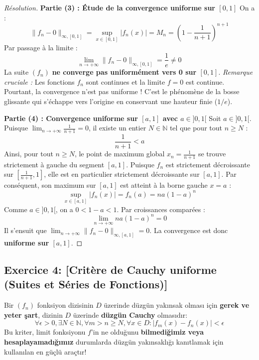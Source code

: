 \documentclass[12pt,a4paper]{report}
\begin{document}
\begin{proof}[Résolution]
\textbf{Partie (3) : Étude de la convergence uniforme sur $[0, 1]$}
On a :
\[ \|f_n - 0\|_{\infty, [0, 1]} = \sup_{x \in [0, 1]} |f_n(x)| = M_n = \left( 1 - \frac{1}{n+1} \right)^{n+1} \]
Par passage à la limite :
\[ \lim_{n \to +\infty} \|f_n - 0\|_{\infty, [0, 1]} = \frac{1}{e} \neq 0 \]
La suite $(f_n)$ \textbf{ne converge pas uniformément vers 0 sur $[0, 1]$}.
\textit{Remarque cruciale :} Les fonctions $f_n$ sont continues et la limite $f=0$ est continue. Pourtant, la convergence n'est pas uniforme ! C'est le phénomène de la bosse glissante qui s'échappe vers l'origine en conservant une hauteur finie ($1/e$).

\textbf{Partie (4) : Convergence uniforme sur $[a, 1]$ avec $a \in ]0, 1[$}
Soit $a \in ]0, 1[$. Puisque $\lim_{n \to +\infty} \frac{1}{n+1} = 0$, il existe un entier $N \in \mathbb{N}$ tel que pour tout $n \ge N$ :
\[ \frac{1}{n+1} < a \]
Ainsi, pour tout $n \ge N$, le point de maximum global $x_n = \frac{1}{n+1}$ se trouve strictement à gauche du segment $[a, 1]$.
Puisque $f_n$ est strictement décroissante sur $[\frac{1}{n+1}, 1]$, elle est en particulier strictement décroissante sur $[a, 1]$.
Par conséquent, son maximum sur $[a, 1]$ est atteint à la borne gauche $x = a$ :
\[ \sup_{x \in [a, 1]} |f_n(x)| = f_n(a) = na(1-a)^n \]
Comme $a \in ]0, 1[$, on a $0 < 1-a < 1$. Par croissances comparées :
\[ \lim_{n \to +\infty} na(1-a)^n = 0 \]
Il s'ensuit que $\lim_{n \to +\infty} \|f_n - 0\|_{\infty, [a, 1]} = 0$.
La convergence est donc \textbf{uniforme sur $[a, 1]$}.
\end{proof}

\subsection*{Exercice 4: [Critère de Cauchy uniforme (Suites et Séries de Fonctions)]}

\begin{tcolorbox}[colback=teal!5!white,colframe=teal!75!black,title=Hatırlatma: Düzgün Cauchy Kriteri (Critère de Cauchy Uniforme)]
Bir $(f_n)$ fonksiyon dizisinin $D$ üzerinde düzgün yakınsak olması için \textbf{gerek ve yeter şart}, dizinin $D$ üzerinde \textbf{düzgün Cauchy} olmasıdır:
\[ \forall \epsilon > 0, \exists N \in \mathbb{N}, \forall m > n \ge N, \forall x \in D : |f_m(x) - f_n(x)| < \epsilon \]
Bu kriter, limit fonksiyonu $f$'in ne olduğunu \textbf{bilmediğimiz veya hesaplayamadığımız} durumlarda düzgün yakınsaklığı kanıtlamak için kullanılan en güçlü araçtır!
\end{tcolorbox}
\end{document}
